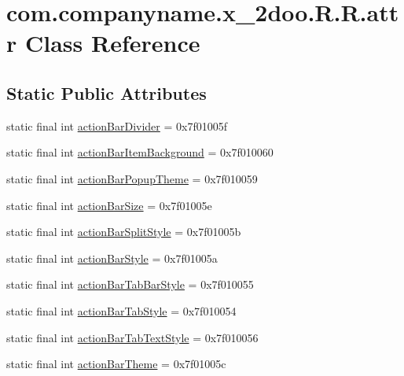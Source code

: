 \hypertarget{classcom_1_1companyname_1_1x__2doo_1_1_r_1_1attr}{
\section{com.companyname.x\_\-2doo.R.R.attr Class Reference}
\label{classcom_1_1companyname_1_1x__2doo_1_1_r_1_1attr}
}
\subsection*{Static Public Attributes}
\begin{CompactItemize}
\item 
static final int \hyperlink{classcom_1_1companyname_1_1x__2doo_1_1_r_1_1attr_ca109af100863f17f49bd1104f978055}{actionBarDivider} = 0x7f01005f
\item 
static final int \hyperlink{classcom_1_1companyname_1_1x__2doo_1_1_r_1_1attr_937f51d1561dde65a4bfec207141964b}{actionBarItemBackground} = 0x7f010060
\item 
static final int \hyperlink{classcom_1_1companyname_1_1x__2doo_1_1_r_1_1attr_d8d08b71d46e591ceb2cf37aff400388}{actionBarPopupTheme} = 0x7f010059
\item 
static final int \hyperlink{classcom_1_1companyname_1_1x__2doo_1_1_r_1_1attr_c1625acac5fe34a8dac7bf00850eea71}{actionBarSize} = 0x7f01005e
\item 
static final int \hyperlink{classcom_1_1companyname_1_1x__2doo_1_1_r_1_1attr_ac78bb4aaa982eb4450169fbade228cd}{actionBarSplitStyle} = 0x7f01005b
\item 
static final int \hyperlink{classcom_1_1companyname_1_1x__2doo_1_1_r_1_1attr_fac08ea086d0d3d0e2249245e5fc058f}{actionBarStyle} = 0x7f01005a
\item 
static final int \hyperlink{classcom_1_1companyname_1_1x__2doo_1_1_r_1_1attr_c00dbca68f5e15ddc304e06a18c43a7d}{actionBarTabBarStyle} = 0x7f010055
\item 
static final int \hyperlink{classcom_1_1companyname_1_1x__2doo_1_1_r_1_1attr_ea2eb2e736d7bed9fe931b868e54ab6e}{actionBarTabStyle} = 0x7f010054
\item 
static final int \hyperlink{classcom_1_1companyname_1_1x__2doo_1_1_r_1_1attr_384ff21c828ae25ca523d215bf59c157}{actionBarTabTextStyle} = 0x7f010056
\item 
static final int \hyperlink{classcom_1_1companyname_1_1x__2doo_1_1_r_1_1attr_8fea81c4b86479ee4960ea3d86c7a6e4}{actionBarTheme} = 0x7f01005c
\item 

\end{CompactItemize}
